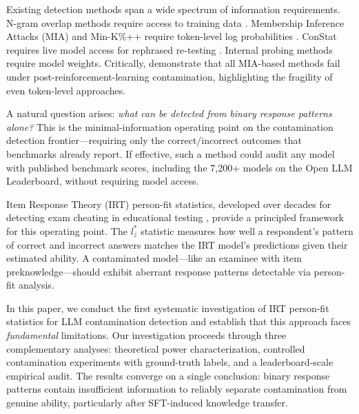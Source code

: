 \documentclass[11pt]{article}
\begin{document}
Existing detection methods span a wide spectrum of information requirements.
N-gram overlap methods require access to training data \citep{brown2020gpt3}.
Membership Inference Attacks (MIA) and Min-K\%++ require token-level log probabilities \citep{shi2024minkpp}.
ConStat requires live model access for rephrased re-testing \citep{dekoninck2024constat}.
Internal probing methods require model weights.
Critically, \citet{wang2025mia} demonstrate that all MIA-based methods fail under post-reinforcement-learning contamination, highlighting the fragility of even token-level approaches.

A natural question arises: \emph{what can be detected from binary response patterns alone?}
This is the minimal-information operating point on the contamination detection frontier---requiring only the correct/incorrect outcomes that benchmarks already report.
If effective, such a method could audit any model with published benchmark scores, including the 7,200+ models on the Open LLM Leaderboard, without requiring model access.

Item Response Theory (IRT) person-fit statistics, developed over decades for detecting exam cheating in educational testing \citep{meijer2001person,snijders2001}, provide a principled framework for this operating point.
The $l_z^*$ statistic \citep{snijders2001} measures how well a respondent's pattern of correct and incorrect answers matches the IRT model's predictions given their estimated ability.
A contaminated model---like an examinee with item preknowledge---should exhibit aberrant response patterns detectable via person-fit analysis.

In this paper, we conduct the first systematic investigation of IRT person-fit statistics for LLM contamination detection and establish that this approach faces \emph{fundamental} limitations.
Our investigation proceeds through three complementary analyses: theoretical power characterization, controlled contamination experiments with ground-truth labels, and a leaderboard-scale empirical audit.
The results converge on a single conclusion: binary response patterns contain insufficient information to reliably separate contamination from genuine ability, particularly after SFT-induced knowledge transfer.
\end{document}
